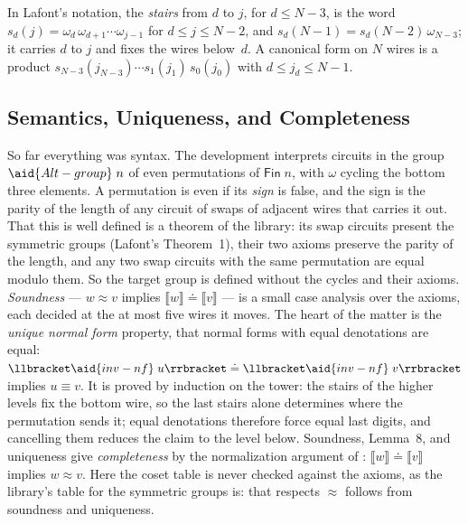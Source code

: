 In Lafont's notation, the \emph{stairs} from $d$ to $j$, for $d\le N-3$, is the word $s_d(j)=\omega_d\,\omega_{d+1}\cdots\omega_{j-1}$ for $d\le j\le N-2$, and $s_d(N-1)=s_d(N-2)\,\omega_{N-3}$; it carries $d$ to $j$ and fixes the wires below~$d$. A canonical form on $N$ wires is a product $s_{N-3}(j_{N-3})\cdots s_1(j_1)\,s_0(j_0)$ with $d\le j_d\le N-1$.

\subsection{Semantics, Uniqueness, and Completeness}\label{sec:case-semantics}

So far everything was syntax. The development interprets circuits in the group $\aid{Alt-group}\;n$ of even permutations of $\mathsf{Fin}\;n$, with $\omega$ cycling the bottom three elements. A permutation is even if its \emph{sign} is false, and the sign is the parity of the length of any circuit of swaps of adjacent wires that carries it out. That this is well defined is a theorem of the library: its swap circuits present the symmetric groups (Lafont's Theorem~1), their two axioms preserve the parity of the length, and any two swap circuits with the same permutation are equal modulo them. So the target group is defined without the cycles and their axioms. \emph{Soundness} --- $w \approx v$ implies $\llbracket w\rrbracket \doteq \llbracket v\rrbracket$ --- is a small case analysis over the axioms, each decided at the at most five wires it moves. The heart of the matter is the \emph{unique normal form} property, that normal forms with equal denotations are equal: $\llbracket \aid{inv-nf}\;u \rrbracket \doteq \llbracket \aid{inv-nf}\;v \rrbracket$ implies $u \equiv v$. It is proved by induction on the tower: the stairs of the higher levels fix the bottom wire, so the last stairs alone determines where the permutation sends it; equal denotations therefore force equal last digits, and cancelling them reduces the claim to the level below. Soundness, Lemma~8, and uniqueness give \emph{completeness} by the normalization argument of : $\llbracket w\rrbracket \doteq \llbracket v\rrbracket$ implies $w \approx v$. Here the coset table is never checked against the axioms, as the library's table for the symmetric groups is: that  respects $\approx$ follows from soundness and uniqueness.
